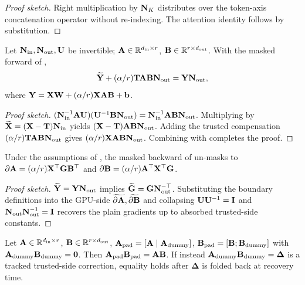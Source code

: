 \begin{proof}[Proof sketch]
Right multiplication by $\NK$ distributes over the token-axis concatenation operator without re-indexing. The attention identity follows by substitution.
\end{proof}

\begin{theorem}
\label{thm:lora-forward}
Let $\Nin, \Nout, \UU$ be invertible; $\A \in \mathbb{R}^{\dinX \times \rtrue}$, $\B \in \mathbb{R}^{\rtrue \times \doutX}$. With the masked forward of ,
\[
\Yt + (\alpha/\rtrue)\Tpad\A\B\Nout = \Y\Nout,
\]
where $\Y = \X\W + (\alpha/\rtrue)\X\A\B + \mathbf{b}$.
\end{theorem}

\begin{proof}[Proof sketch]
$(\Nin^{-1}\A\UU)(\UU^{-1}\B\Nout) = \Nin^{-1}\A\B\Nout$. Multiplying by $\Xt = (\X-\Tpad)\Nin$ yields $(\X-\Tpad)\A\B\Nout$. Adding the trusted compensation $(\alpha/\rtrue)\Tpad\A\B\Nout$ gives $(\alpha/\rtrue)\X\A\B\Nout$. Combining with  completes the proof.
\end{proof}

\begin{theorem}
\label{thm:lora-backward}
Under the assumptions of , the masked backward of  un-masks to $\partial\A = (\alpha/\rtrue)\X^{\top}\G\B^{\top}$ and $\partial\B = (\alpha/\rtrue)\A^{\top}\X^{\top}\G$.
\end{theorem}

\begin{proof}[Proof sketch]
$\Yt = \Y\Nout$ implies $\Gt = \G\Nout^{-\top}$. Substituting the boundary definitions into the GPU-side $\widetilde{\partial\A}, \widetilde{\partial\B}$ and collapsing $\UU\UU^{-1} = \mathbf{I}$ and $\Nout\Nout^{-1} = \mathbf{I}$ recovers the plain gradients up to absorbed trusted-side constants.
\end{proof}

\begin{theorem}
\label{thm:rank-pad}
Let $\A \in \mathbb{R}^{\dinX \times \rtrue}$, $\B \in \mathbb{R}^{\rtrue \times \doutX}$, $\Apad = [\A \mid \Adummy]$, $\Bpad = [\B; \Bdummy]$ with $\Adummy\Bdummy = \mathbf{0}$. Then $\Apad\Bpad = \A\B$. If instead $\Adummy\Bdummy = \boldsymbol{\Delta}$ is a tracked trusted-side correction, equality holds after $\boldsymbol{\Delta}$ is folded back at recovery time.
\end{theorem}

